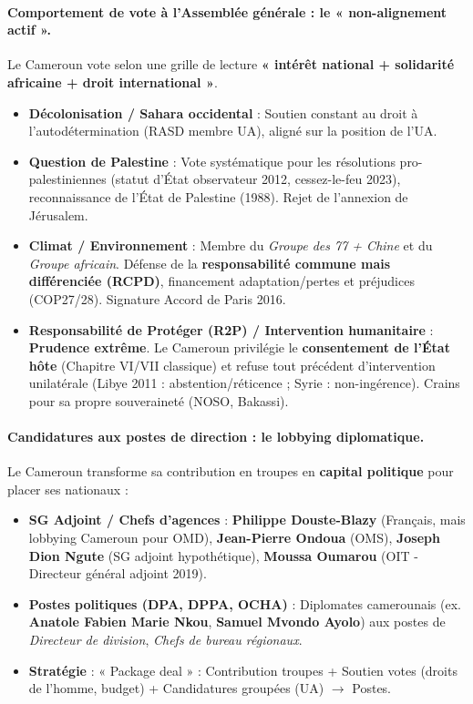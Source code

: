 \documentclass[11pt]{article}
\begin{document}
\paragraph{Comportement de vote à l'Assemblée générale : le « non-alignement actif ».}
Le Cameroun vote selon une grille de lecture \textbf{« intérêt national + solidarité africaine + droit international »}.
\begin{itemize}
    \item \textbf{Décolonisation / Sahara occidental} : Soutien constant au droit à l'autodétermination (RASD membre UA), aligné sur la position de l'UA.
    \item \textbf{Question de Palestine} : Vote systématique pour les résolutions pro-palestiniennes (statut d'État observateur 2012, cessez-le-feu 2023), reconnaissance de l'État de Palestine (1988). Rejet de l'annexion de Jérusalem.
    \item \textbf{Climat / Environnement} : Membre du \emph{Groupe des 77 + Chine} et du \emph{Groupe africain}. Défense de la \textbf{responsabilité commune mais différenciée (RCPD)}, financement adaptation/pertes et préjudices (COP27/28). Signature Accord de Paris 2016.
    \item \textbf{Responsabilité de Protéger (R2P) / Intervention humanitaire} : \textbf{Prudence extrême}. Le Cameroun privilégie le \textbf{consentement de l'État hôte} (Chapitre VI/VII classique) et refuse tout précédent d'intervention unilatérale (Libye 2011 : abstention/réticence ; Syrie : non-ingérence). Crains pour sa propre souveraineté (NOSO, Bakassi).
\end{itemize}

\paragraph{Candidatures aux postes de direction : le lobbying diplomatique.}
Le Cameroun transforme sa contribution en troupes en \textbf{capital politique} pour placer ses nationaux :
\begin{itemize}
    \item \textbf{SG Adjoint / Chefs d'agences} : \textbf{Philippe Douste-Blazy} (Français, mais lobbying Cameroun pour OMD), \textbf{Jean-Pierre Ondoua} (OMS), \textbf{Joseph Dion Ngute} (SG adjoint hypothétique), \textbf{Moussa Oumarou} (OIT - Directeur général adjoint 2019).
    \item \textbf{Postes politiques (DPA, DPPA, OCHA)} : Diplomates camerounais (ex. \textbf{Anatole Fabien Marie Nkou}, \textbf{Samuel Mvondo Ayolo}) aux postes de \emph{Directeur de division}, \emph{Chefs de bureau régionaux}.
    \item \textbf{Stratégie} : « Package deal » : Contribution troupes + Soutien votes (droits de l'homme, budget) + Candidatures groupées (UA) $\rightarrow$ Postes.
\end{itemize}
\end{document}
